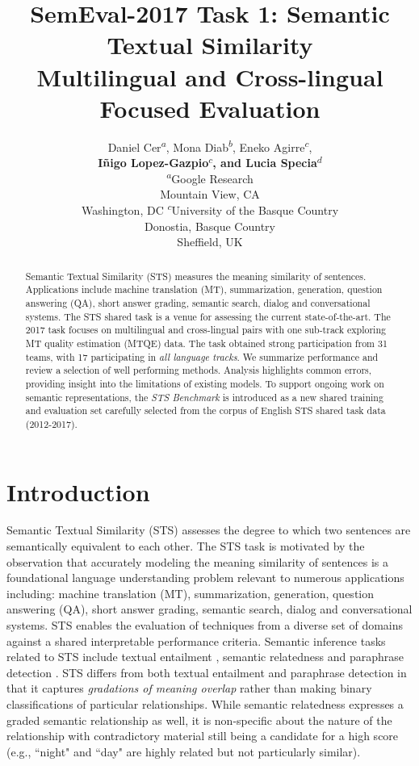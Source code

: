 \documentclass[11pt,a4paper]{article}
\title{SemEval-2017 Task 1: Semantic Textual Similarity \\ Multilingual and Cross-lingual Focused Evaluation}
\author{
Daniel Cer\textsuperscript{$a$}, 
Mona Diab\textsuperscript{$b$},
Eneko Agirre\textsuperscript{$c$}, 
\\\rm\textbf{I\~nigo Lopez-Gazpio\textsuperscript{$c$},
                  and Lucia Specia\textsuperscript{$d$}}
\\\AND
{\rm\textsuperscript{$a$}Google Research}\\Mountain View, CA \And {\rm\textsuperscript{$b$}George Washington University}\\Washington, DC  \AND 
{\rm\textsuperscript{$c$}University of the Basque Country}\\Donostia, Basque Country \And {\rm\textsuperscript{$d$}University of Sheffield}\\Sheffield, UK}
\date{}
\begin{document}
\maketitle
\begin{abstract}
  Semantic Textual Similarity (STS) measures the meaning similarity of sentences. Applications include machine translation (MT), summarization, generation, question answering (QA), short answer grading, semantic search, dialog and conversational systems.
  The STS shared task is a venue for assessing the current state-of-the-art.
  The 2017 task focuses on multilingual and cross-lingual pairs with one sub-track exploring MT quality estimation (MTQE) data. The task obtained strong participation from 31 teams, with 17 participating in \emph{all  language tracks}. We summarize performance and review a selection of well performing methods. Analysis highlights common errors, providing insight into the limitations of existing models. To support ongoing work on semantic representations, the {\em STS Benchmark} is introduced as a new shared training and evaluation set carefully selected from the corpus of English STS shared task data (2012-2017).
\end{abstract}

\section{Introduction}

Semantic Textual Similarity (STS) assesses the degree to which two sentences are semantically equivalent to each other.
The STS task is motivated by the observation that accurately modeling the meaning similarity of sentences is a foundational language understanding problem relevant to numerous applications including: machine translation (MT), summarization, generation, question answering (QA), short answer grading, semantic search, dialog and conversational systems. STS enables the evaluation of techniques from a diverse set of domains against a shared interpretable performance criteria. Semantic inference tasks related to STS include textual entailment \cite{Bentivogli2016, snli:emnlp2015, dagan2009}, semantic relatedness \cite{Bentivogli2016} and paraphrase detection \cite{xu2015semeval, ganitkevitch2013ppdb, :msrpp}. STS differs from both textual entailment and paraphrase detection in that it captures {\it gradations of meaning overlap} rather than making binary classifications of particular relationships. While semantic relatedness expresses a graded semantic relationship as well, it is non-specific about the nature of the relationship with contradictory material still being a candidate for a high score (e.g., ``night" and ``day" are highly related but not particularly similar).
\end{document}
